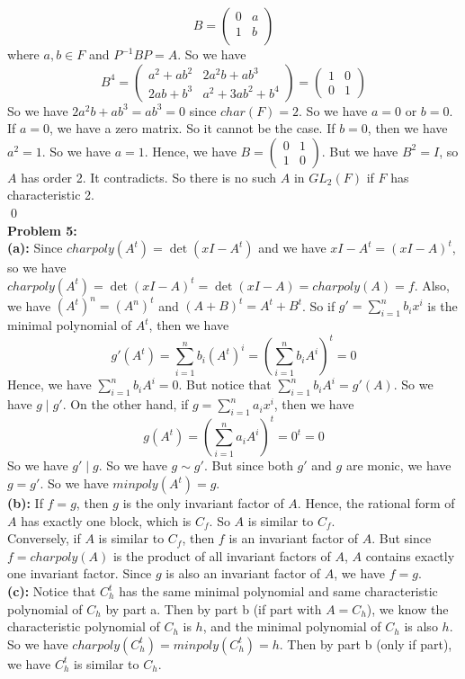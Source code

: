\documentclass[12pt]{amsart}
\begin{document}
\[B=\begin{pmatrix}
    0&a\\
    1&b\\
\end{pmatrix}\]
where $a,b\in F$ and $P^{-1}BP=A$. So we have 
\[B^4=\begin{pmatrix}
    a^2+ab^2&2a^2b+ab^3\\
    2ab+b^3 & a^2+3ab^2+b^4
\end{pmatrix}=\begin{pmatrix}
    1&0\\
    0&1
\end{pmatrix}\]
So we have $2a^2b+ab^3=ab^3=0$ since $char(F)=2$. So we have $a=0$ or $b=0$. If $a=0$, we have a zero matrix. So it cannot be the case. If $b=0$, then we have $a^2=1$. So we have $a=1$. Hence, we have $B=\begin{pmatrix}
    0&1\\
    1&0
\end{pmatrix}$. But we have $B^2=I$, so $A$ has order 2. It contradicts. So there is no such $A$ in $GL_2(F)$ if $F$ has characteristic 2.
\\\qed\\
\textbf{Problem 5:}\\
\textbf{(a):} Since $charpoly(A^t)=\det(xI-A^t)$ and we have 
$xI-A^t=(xI-A)^t$, so we have $charpoly(A^t)=\det(xI-A)^t=\det(xI-A)=charpoly(A)=f$. Also, we have $(A^t)^n=(A^n)^t$ and $(A+B)^t=A^t+B^t$. So if $g'=\sum_{i=1}^nb_ix^i$ is the minimal polynomial of $A^t$, then we have 
\[g'(A^t)=\sum_{i=1}^nb_i(A^t)^i=(\sum_{i=1}^nb_iA^i)^t=0\]
Hence, we have $\sum_{i=1}^nb_iA^i=0$. But notice that $\sum_{i=1}^nb_iA^i=g'(A)$. So we have $g\mid g'$. On the other hand, if $g=\sum_{i=1}^na_ix^i$, then we have 
\[g(A^t)=(\sum_{i=1}^na_iA^i)^t=0^t=0\]
So we have $g'\mid g$. So we have $g\sim g'$. But since both $g'$ and $g$ are monic, we have $g=g'$. So we have $minpoly(A^t)=g$.\\
\textbf{(b): }If $f=g$, then $g$ is the only invariant factor of $A$. Hence, the rational form of $A$ has exactly one block, which is $C_f$. So $A$ is similar to $C_f$.\\
Conversely, if $A$ is similar to $C_f$, then $f$ is an invariant factor of $A$. But since $f=charpoly(A)$ is the product of all invariant factors of $A$, $A$ contains exactly one invariant factor. Since $g$ is also an invariant factor of $A$, we have $f=g$.\\
\textbf{(c):} Notice that $C_h^t$ has the same minimal polynomial and same characteristic polynomial of $C_h$ by part a. Then by part b (if part with $A=C_h$), we know the characteristic polynomial of $C_h$ is $h$, and the minimal polynomial of $C_h$ is also $h$. So we have $charpoly(C_h^t)=minpoly(C_h^t)=h$. Then by part b (only if part), we have $C_h^t$ is similar to $C_h$.\\
\end{document}
